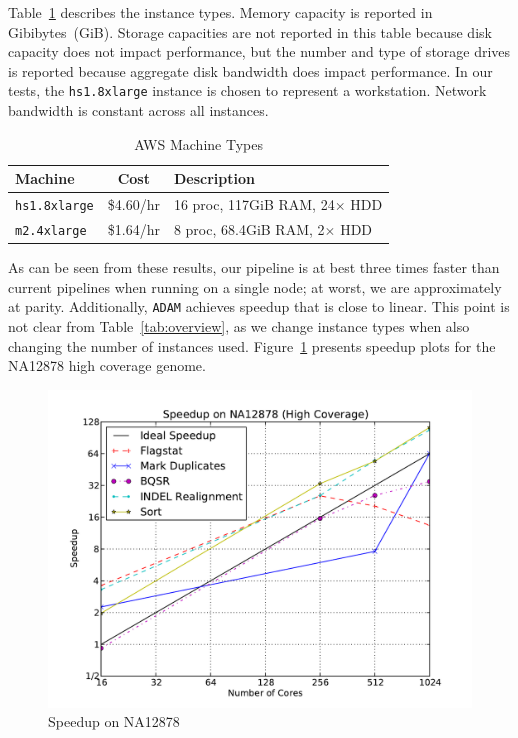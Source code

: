 \documentclass[masters]{ucbthesis}
\begin{document}
Table~\ref{tab:machines} describes the instance types. Memory capacity is reported in Gibibytes~(GiB).
Storage capacities are not reported in this table because disk
capacity does not impact performance, but the number and type of storage drives is reported because
aggregate disk bandwidth does impact performance. In our tests, the \texttt{hs1.8xlarge} instance is
chosen to represent a workstation. Network bandwidth is constant across all instances.

\begin{table}[h]
\caption{AWS Machine Types}
\label{tab:machines}
\begin{center}
\begin{tabular}{ l c l }
\hline
\textbf{Machine} & \textbf{Cost} & \textbf{Description} \\
\hline
\hline
\texttt{hs1.8xlarge} & \$4.60/hr & 16 proc, 117GiB RAM, 24$\times$ HDD \\
\texttt{m2.4xlarge} & \$1.64/hr & 8 proc, 68.4GiB RAM, 2$\times$ HDD \\
\hline
\end{tabular}
\end{center}
\end{table}

As can be seen from these results, our pipeline is at best three times faster than current pipelines when running
on a single node; at worst, we are approximately at parity. Additionally, \texttt{ADAM} achieves speedup that is
close to linear. This point is not clear from Table~\ref{tab:overview}, as we change instance types when also
changing the number of instances used. Figure~\ref{fig:speedup} presents speedup plots for the NA12878 high
coverage genome.

\begin{figure}[h]
\begin{center}
\includegraphics[width=0.99\linewidth]{graphs/speedup_na12878.pdf}
\end{center}
\caption{Speedup on NA12878}
\label{fig:speedup}
\end{figure}
\end{document}
